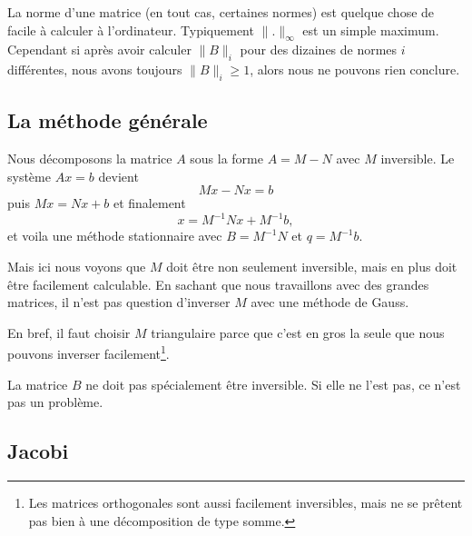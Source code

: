 La norme d'une matrice (en tout cas, certaines normes) est quelque chose de facile à calculer à l'ordinateur. Typiquement \( \| . \|_{\infty}\) est un simple maximum. Cependant si après avoir calculer \( \| B \|_i\) pour des dizaines de normes \( i\) différentes, nous avons toujours \( \| B\|_i\geq 1\), alors nous ne pouvons rien conclure.

\subsection{La méthode générale}

Nous décomposons la matrice \( A\) sous la forme \( A=M-N\) avec \( M\) inversible. Le système \( Ax=b\) devient
\begin{equation}
    Mx-Nx=b
\end{equation}
puis \( Mx=Nx+b\) et finalement 
\begin{equation}
    x=M^{-1}Nx+M^{-1}b,
\end{equation}
et voila une méthode stationnaire avec \( B=M^{-1}N\) et \( q=M^{-1}b\).

Mais ici nous voyons que \( M\) doit être non seulement inversible, mais en plus doit être facilement calculable. En sachant que nous travaillons avec des grandes matrices, il n'est pas question d'inverser \( M\) avec une méthode de Gauss.

En bref, il faut choisir \( M\) triangulaire parce que c'est en gros la seule que nous pouvons inverser facilement\footnote{Les matrices orthogonales sont aussi facilement inversibles, mais ne se prêtent pas bien à une décomposition de type somme.}.

\begin{remark}
    La matrice \( B\) ne doit pas spécialement être inversible. Si elle ne l'est pas, ce n'est pas un problème.
\end{remark}

\subsection{Jacobi}

